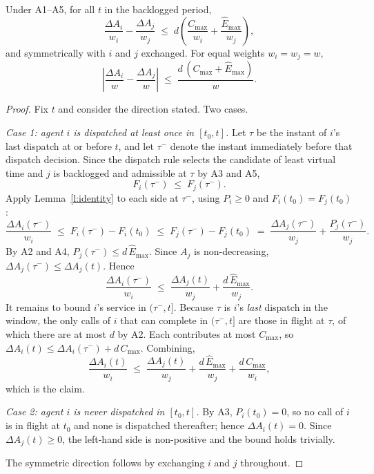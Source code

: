 \documentclass[letterpaper,11pt,leqno]{article}
\begin{document}
\begin{theorem}\label{t:rvt}
Under A1--A5, for all $t$ in the backlogged period,
\[
  \frac{\Delta A_i}{w_i} - \frac{\Delta A_j}{w_j} \;\le\; d\left(\frac{C_{\max}}{w_i} + \frac{\hat{E}_{\max}}{w_j}\right),
\]
and symmetrically with $i$ and $j$ exchanged. For equal weights $w_i = w_j = w$,
\[
  \left|\frac{\Delta A_i}{w} - \frac{\Delta A_j}{w}\right| \;\le\; \frac{d\,(C_{\max} + \hat{E}_{\max})}{w}.
\]
\end{theorem}

\begin{proof}
Fix $t$ and consider the direction stated. Two cases.

\emph{Case 1: agent $i$ is dispatched at least once in $[t_0, t]$.} Let $\tau$ be the instant of $i$'s last dispatch at or before $t$, and let $\tau^-$ denote the instant immediately before that dispatch decision. Since the dispatch rule selects the candidate of least virtual time and $j$ is backlogged and admissible at $\tau$ by A3 and A5,
\[
  F_i(\tau^-) \;\le\; F_j(\tau^-).
\]
Apply Lemma~\ref{l:identity} to each side at $\tau^-$, using $P_i \ge 0$ and $F_i(t_0) = F_j(t_0)$:
\[
  \frac{\Delta A_i(\tau^-)}{w_i} \;\le\; F_i(\tau^-) - F_i(t_0)
  \;\le\; F_j(\tau^-) - F_j(t_0)
  \;=\; \frac{\Delta A_j(\tau^-)}{w_j} + \frac{P_j(\tau^-)}{w_j}.
\]
By A2 and A4, $P_j(\tau^-) \le d\,\hat{E}_{\max}$. Since $A_j$ is non-decreasing, $\Delta A_j(\tau^-) \le \Delta A_j(t)$. Hence
\[
  \frac{\Delta A_i(\tau^-)}{w_i} \;\le\; \frac{\Delta A_j(t)}{w_j} + \frac{d\,\hat{E}_{\max}}{w_j}.
\]
It remains to bound $i$'s service in $(\tau^-, t]$. Because $\tau$ is $i$'s \emph{last} dispatch in the window, the only calls of $i$ that can complete in $(\tau^-, t]$ are those in flight at $\tau$, of which there are at most $d$ by A2. Each contributes at most $C_{\max}$, so $\Delta A_i(t) \le \Delta A_i(\tau^-) + d\,C_{\max}$. Combining,
\[
  \frac{\Delta A_i(t)}{w_i} \;\le\; \frac{\Delta A_j(t)}{w_j} + \frac{d\,\hat{E}_{\max}}{w_j} + \frac{d\,C_{\max}}{w_i},
\]
which is the claim.

\emph{Case 2: agent $i$ is never dispatched in $[t_0, t]$.} By A3, $P_i(t_0) = 0$, so no call of $i$ is in flight at $t_0$ and none is dispatched thereafter; hence $\Delta A_i(t) = 0$. Since $\Delta A_j(t) \ge 0$, the left-hand side is non-positive and the bound holds trivially.

The symmetric direction follows by exchanging $i$ and $j$ throughout.
\end{proof}
\end{document}
